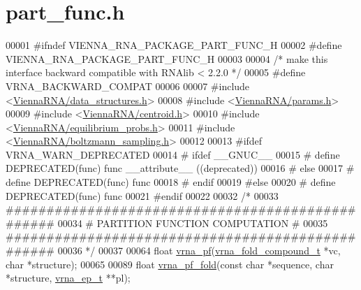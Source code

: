 \hypertarget{part__func_8h_source}{}\section{part\+\_\+func.\+h}
\label{part__func_8h_source}

\begin{DoxyCode}
00001 \textcolor{preprocessor}{#ifndef VIENNA\_RNA\_PACKAGE\_PART\_FUNC\_H}
00002 \textcolor{preprocessor}{#define VIENNA\_RNA\_PACKAGE\_PART\_FUNC\_H}
00003 
00004 \textcolor{comment}{/* make this interface backward compatible with RNAlib < 2.2.0 */}
00005 \textcolor{preprocessor}{#define VRNA\_BACKWARD\_COMPAT}
00006 
00007 \textcolor{preprocessor}{#include <\hyperlink{data__structures_8h}{ViennaRNA/data\_structures.h}>}
00008 \textcolor{preprocessor}{#include <\hyperlink{params_8h}{ViennaRNA/params.h}>}
00009 \textcolor{preprocessor}{#include <\hyperlink{centroid_8h}{ViennaRNA/centroid.h}>}
00010 \textcolor{preprocessor}{#include <\hyperlink{equilibrium__probs_8h}{ViennaRNA/equilibrium\_probs.h}>}
00011 \textcolor{preprocessor}{#include <\hyperlink{boltzmann__sampling_8h}{ViennaRNA/boltzmann\_sampling.h}>}
00012 
00013 \textcolor{preprocessor}{#ifdef VRNA\_WARN\_DEPRECATED}
00014 \textcolor{preprocessor}{# ifdef \_\_GNUC\_\_}
00015 \textcolor{preprocessor}{#  define DEPRECATED(func) func \_\_attribute\_\_ ((deprecated))}
00016 \textcolor{preprocessor}{# else}
00017 \textcolor{preprocessor}{#  define DEPRECATED(func) func}
00018 \textcolor{preprocessor}{# endif}
00019 \textcolor{preprocessor}{#else}
00020 \textcolor{preprocessor}{# define DEPRECATED(func) func}
00021 \textcolor{preprocessor}{#endif}
00022 
00032 \textcolor{comment}{/*}
00033 \textcolor{comment}{#################################################}
00034 \textcolor{comment}{# PARTITION FUNCTION COMPUTATION                #}
00035 \textcolor{comment}{#################################################}
00036 \textcolor{comment}{*/}
00037 
00064 \textcolor{keywordtype}{float} \hyperlink{group__pf__fold_ga29e256d688ad221b78d37f427e0e99bc}{vrna\_pf}(\hyperlink{group__fold__compound_structvrna__fc__s}{vrna\_fold\_compound\_t} *vc, \textcolor{keywordtype}{char} *structure);
00065 
00089 \textcolor{keywordtype}{float} \hyperlink{group__pf__fold_gac4a2a74a79e49818bc35412a2b392c7e}{vrna\_pf\_fold}(\textcolor{keyword}{const} \textcolor{keywordtype}{char} *sequence, \textcolor{keywordtype}{char} *structure, \hyperlink{group__struct__utils_structvrna__elem__prob__s}{vrna\_ep\_t} **pl);

\end{DoxyCode}
